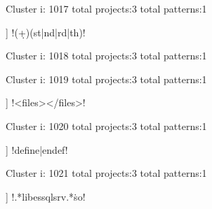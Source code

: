 Cluster i: 1017
total projects:3
total patterns:1
\begin{multicols}{1}
\begin{description}[noitemsep,topsep=0pt]
\item [[3] ] \cverb!(\d+)(st|nd|rd|th)!
\end{description}
\end{multicols}







Cluster i: 1018
total projects:3
total patterns:1
\begin{multicols}{1}
\end{multicols}







Cluster i: 1019
total projects:3
total patterns:1
\begin{multicols}{1}
\begin{description}[noitemsep,topsep=0pt]
\item [[3] ] \cverb!<files>\s*</files>!
\end{description}
\end{multicols}







Cluster i: 1020
total projects:3
total patterns:1
\begin{multicols}{1}
\begin{description}[noitemsep,topsep=0pt]
\item [[3] ] \cverb!\s*define|\s*endef!
\end{description}
\end{multicols}







Cluster i: 1021
total projects:3
total patterns:1
\begin{multicols}{1}
\begin{description}[noitemsep,topsep=0pt]
\item [[3] ] \cverb!.*libessqlsrv.*\.so!
\end{description}
\end{multicols}







